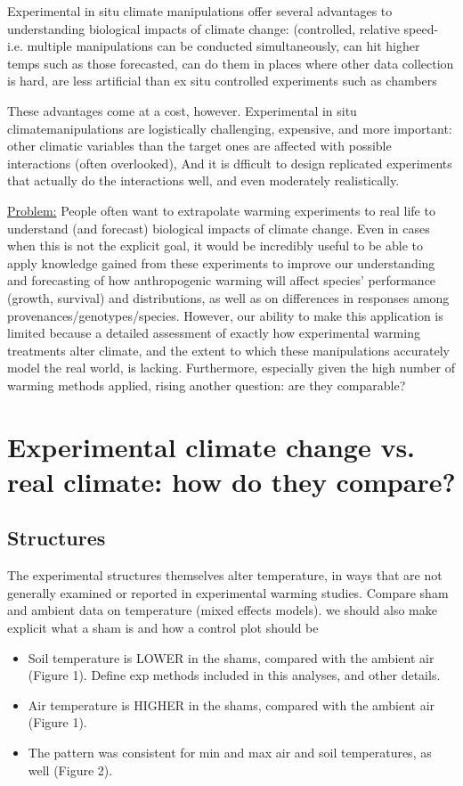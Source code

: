 \documentclass{article}
\begin{document}
\par Experimental in situ climate manipulations offer several advantages to understanding biological impacts of climate change: (controlled, relative speed- i.e. multiple manipulations can be conducted simultaneously, can hit higher temps such as those forecasted, can do them in places where other data collection is hard, are less artificial than ex situ controlled experiments such as chambers
\par These advantages come at a cost, however. Experimental in situ climatemanipulations are logistically challenging, expensive, and more important: other climatic variables than the target ones are affected with possible interactions (often overlooked), And it is dfficult to design replicated experiments that actually do the interactions well, and even moderately realistically.
\par \underline{Problem:} People often want to extrapolate warming experiments to real life to understand (and forecast) biological impacts of climate change. Even in cases when this is not the explicit goal, it would be incredibly useful to be able to apply knowledge gained from these experiments to improve our understanding and forecasting of how anthropogenic warming will affect species' performance (growth, survival) and distributions, as well as on differences in responses among provenances/genotypes/species. However, our ability to make this application is limited because a detailed assessment of exactly how experimental warming treatments alter climate, and the extent to which these manipulations accurately model the real world,
is lacking. Furthermore, especially given the high number of warming methods applied, rising another question: are they comparable?
\section {Experimental climate change vs. real climate:
how do they compare?}
\subsection {Structures}
The experimental structures themselves alter temperature, in ways that are
not generally examined or reported in experimental warming studies. Compare
sham and ambient data on temperature (mixed effects models). we should also make explicit what a sham is and how a control plot should be
\begin{itemize}
\item Soil temperature is LOWER in the shams, compared with the ambient
air (Figure 1). Define exp methods included in this analyses, and other details.
\item Air temperature is HIGHER in the shams, compared with the ambient
air (Figure 1).
\item The pattern was consistent for min and max air and soil temperatures, as
well (Figure 2).
\end{itemize}
\end{document}
